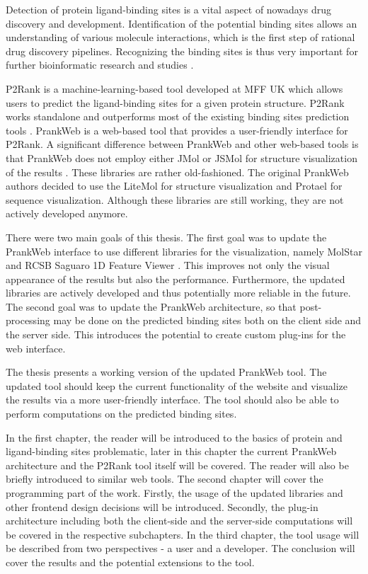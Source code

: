 

Detection of protein ligand-binding sites is a vital aspect of nowadays drug discovery and development. Identification of the potential binding sites allows an understanding of various molecule interactions, which is the first step of rational drug discovery pipelines. Recognizing the binding sites is thus very important for further bioinformatic research and studies \cite{10.1093/bioinformatics/btt447}.

P2Rank is a machine-learning-based tool developed at MFF UK which allows users to predict the ligand-binding sites for a given protein structure. P2Rank works standalone and outperforms most of the existing binding sites prediction tools \cite{krivak2018p2rank}. PrankWeb is a web-based tool that provides a user-friendly interface for P2Rank. A significant difference between PrankWeb and other web-based tools is that PrankWeb does not employ either JMol or JSMol for structure visualization of the results \cite{jendele2019prankweb}. These libraries are rather old-fashioned. The original PrankWeb authors decided to use the LiteMol for structure visualization and Protael for sequence visualization. Although these libraries are still working, they are not actively developed anymore.

There were two main goals of this thesis. The first goal was to update the PrankWeb interface to use different libraries for the visualization, namely MolStar \cite{10.1093/nar/gkab314} and RCSB Saguaro 1D Feature Viewer \cite{10.1093/bioinformatics/btaa1012}. This improves not only the visual appearance of the results but also the performance. Furthermore, the updated libraries are actively developed and thus potentially more reliable in the future. The second goal was to update the PrankWeb architecture, so that post-processing may be done on the predicted binding sites both on the client side and the server side. This introduces the potential to create custom plug-ins for the web interface.

The thesis presents a working version of the updated PrankWeb tool. The updated tool should keep the current functionality of the website and visualize the results via a more user-friendly interface. The tool should also be able to perform computations on the predicted binding sites.

In the first chapter, the reader will be introduced to the basics of protein and ligand-binding sites problematic, later in this chapter the current PrankWeb architecture and the P2Rank tool itself will be covered. The reader will also be briefly introduced to similar web tools. The second chapter will cover the programming part of the work. Firstly, the usage of the updated libraries and other frontend design decisions will be introduced. Secondly, the plug-in architecture including both the client-side and the server-side computations will be covered in the respective subchapters. In the third chapter, the tool usage will be described from two perspectives - a user and a developer. The conclusion will cover the results and the potential extensions to the tool.
